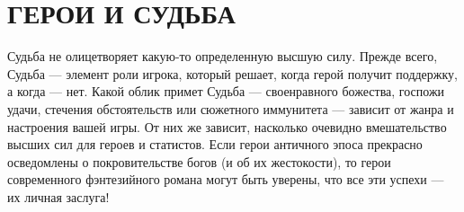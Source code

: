 \section{ГЕРОИ И СУДЬБА}
Судьба не олицетворяет какую-то определенную высшую силу. Прежде всего, Судьба — элемент роли игрока, который решает, когда герой получит поддержку, а когда — нет. Какой облик примет Судьба — своенравного божества, госпожи удачи, стечения обстоятельств или сюжетного иммунитета — зависит от жанра и настроения вашей игры. От них же зависит, насколько очевидно вмешательство высших сил для героев и статистов. Если герои античного эпоса прекрасно осведомлены о покровительстве богов (и об их жестокости), то герои современного фэнтезийного романа могут быть уверены, что все эти успехи — их личная заслуга!